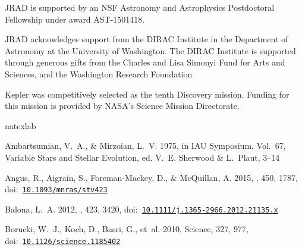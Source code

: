 \documentclass[preprint2]{aastex62}
\begin{document}
\acknowledgments
JRAD is supported by an NSF Astronomy and Astrophysics Postdoctoral Fellowship under award AST-1501418.

JRAD acknowledges support from the DIRAC Institute in the Department of Astronomy at the University of Washington. The DIRAC Institute is supported through generous gifts from the Charles and Lisa Simonyi Fund for Arts and Sciences, and the Washington Research Foundation


Kepler was competitively selected as the tenth Discovery mission. Funding for this mission is provided by NASA's Science Mission Directorate.



% 

\begin{thebibliography}{}
\expandafter\ifx\csname natexlab\endcsname\relax\def\natexlab#1{#1}\fi
\providecommand{\url}[1]{\href{#1}{#1}}
\providecommand{\dodoi}[1]{doi:~\href{http://doi.org/#1}{\nolinkurl{#1}}}
\providecommand{\doeprint}[1]{\href{http://ascl.net/#1}{\nolinkurl{http://ascl.net/#1}}}
\providecommand{\doarXiv}[1]{\href{https://arxiv.org/abs/#1}{\nolinkurl{https://arxiv.org/abs/#1}}}

{Ambartsumian}, V.~A., \& {Mirzoian}, L.~V. 1975, in IAU Symposium, Vol.~67,
  Variable Stars and Stellar Evolution, ed. V.~E. {Sherwood} \& L.~{Plaut},
  3--14

{Angus}, R., {Aigrain}, S., {Foreman-Mackey}, D., \& {McQuillan}, A. 2015,
  \mnras, 450, 1787, \dodoi{10.1093/mnras/stv423}

{Balona}, L.~A. 2012, \mnras, 423, 3420,
  \dodoi{10.1111/j.1365-2966.2012.21135.x}

{Borucki}, W.~J., {Koch}, D., {Basri}, G., {et~al.} 2010, Science, 327, 977,
  \dodoi{10.1126/science.1185402}


\end{thebibliography}
\end{document}
